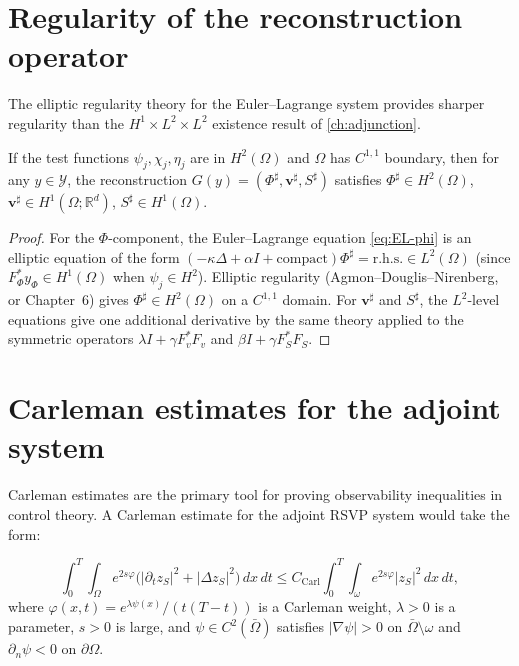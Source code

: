 \documentclass[12pt, oneside]{memoir}
\newcommand{\bv}{\mathbf{v}}
\begin{document}
\section{Regularity of the reconstruction operator}

The elliptic regularity theory for the Euler--Lagrange system 
provides sharper regularity than the $H^1 \times L^2 \times L^2$ existence result of
\cref{ch:adjunction}.

\begin{proposition}
\label{prop:higher-reg}
If the test functions $\psi_j, \chi_j, \eta_j$ are in $H^2(\Omega)$ and $\Omega$ has
$C^{1,1}$ boundary, then for any $y \in \mathcal{Y}$, the reconstruction $G(y) =
(\Phi^\sharp, \bv^\sharp, S^\sharp)$ satisfies $\Phi^\sharp \in H^2(\Omega)$, $\bv^\sharp
\in H^1(\Omega;\mathbb{R}^d)$, $S^\sharp \in H^1(\Omega)$.
\end{proposition}

\begin{proof}
For the $\Phi$-component, the Euler--Lagrange equation \cref{eq:EL-phi} is an elliptic
equation of the form $(-\kappa\Delta + \alpha I + \text{compact})\Phi^\sharp =
\text{r.h.s.} \in L^2(\Omega)$ (since $F_\Phi^* y_\Phi \in H^1(\Omega)$ when $\psi_j
\in H^2$).  Elliptic regularity (Agmon--Douglis--Nirenberg, or \cite{evans2010}
Chapter~6) gives $\Phi^\sharp \in H^2(\Omega)$ on a $C^{1,1}$ domain.  For $\bv^\sharp$
and $S^\sharp$, the $L^2$-level equations give one additional derivative by the same
theory applied to the symmetric operators $\lambda I + \gamma F_v^* F_v$ and $\beta I +
\gamma F_S^* F_S$.
\end{proof}

\section{Carleman estimates for the adjoint system}

Carleman estimates are the primary tool for proving observability inequalities in control
theory.  A Carleman estimate for the adjoint RSVP system 
would take the form:

\begin{equation}\label{eq:carleman}
  \int_0^T \int_\Omega e^{2s\varphi} \bigl(|\partial_t z_S|^2 + |\Delta z_S|^2\bigr)\,
  dx\, dt
  \le C_{\mathrm{Carl}} \int_0^T \int_\omega e^{2s\varphi} |z_S|^2\, dx\, dt,
\end{equation}
where $\varphi(x,t) = e^{\lambda\psi(x)} / (t(T-t))$ is a Carleman weight, $\lambda > 0$
is a parameter, $s > 0$ is large, and $\psi \in C^2(\bar\Omega)$ satisfies $|\nabla\psi|
> 0$ on $\bar\Omega \setminus \omega$ and $\partial_n \psi < 0$ on $\partial\Omega$.
\end{document}

